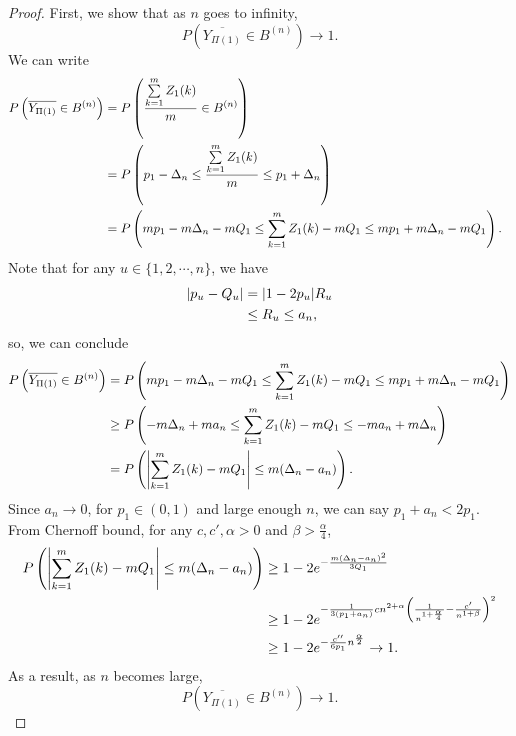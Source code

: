 \begin{proof}
First, we show that as $n$ goes to infinity,
\[P\left( \overline{Y_{\Pi(1) }}\in B^{(n)}\right) \rightarrow 1.\]
We can write
\begin{align}
\no P\left(\overline{Y_{\Pi(1)}} \in B^{(n)}\right) &= P\left(\frac{\sum\limits_{k=1}^{m}Z_1(k)}{m} \in  B^{(n)} \right)\\
\nonumber &= P\left(p_1-\Delta_n \leq\frac{\sum\limits_{k=1}^{m}Z_1(k)}{m}\leq p_1+\Delta_n \right)\\
\nonumber &= P\left(mp_1-m\Delta_n-mQ_1\leq \sum\limits_{k=1}^{m}Z_1(k)-mQ_1\leq  mp_1+m\Delta_n-mQ_1 \right).\ \
\end{align}
Note that for any $u \in \{1,2,\cdots, n \}$, we have
\begin{align}
\no |p_u-{Q}_u| &=|1-2p_u|R_u \\
\no & \leq R_u \leq a_n,
\end{align}
so, we can conclude
\begin{align}
\no P\left(\overline{Y_{\Pi(1)}} \in B^{(n)}\right) &= P\left(mp_1-m\Delta_n-mQ_1\leq \sum\limits_{k=1}^{m}Z_1(k)-mQ_1 \leq mp_1+m\Delta_n-mQ_1 \right)\\
\nonumber  &\geq P\left(-m\Delta_n+m a_n\leq \sum\limits_{k=1}^{m}Z_1(k)-mQ_1\leq -ma_n+m\Delta_n \right)\\
\nonumber &= P\left(\abs*{\sum\limits_{k=1}^{m}Z_1(k)-mQ_1}\leq m (\Delta_n-a_n) \right).\ \
\end{align}
Since $a_n \rightarrow 0$, for $p_1 \in (0,1)$ and large enough $n$, we can say $p_1+a_n < 2 p_1$. From Chernoff bound, for any $c,c',\alpha>0$ and $\beta>\frac{\alpha}{4}$,
\begin{align}
\no P\left(\abs*{\sum\limits_{k=1}^{m}Z_1(k)-mQ_1}\leq m (\Delta_n-a_n) \right) &\geq 1-2e^{-\frac{m(\Delta_n-a_n)^2}{3Q_1}} \\
\nonumber &\geq 1-2e^{-\frac{1}{3(p_1+a_n)}cn^{2+\alpha}\left(\frac{1}{n^{1+\frac{\alpha}{4}}}- \frac{c'}{n^{1 +  \beta}}\right)^2}\\
\nonumber &\geq 1-2e^{-\frac{c''}{6 p_1}n^{\frac{\alpha}{2}}}\rightarrow 1. \ \
\end{align}
As a result, as $n$ becomes large,
\[P\left(\overline{Y_{\Pi(1)}} \in B^{(n)}\right) \rightarrow 1.\]


\end{proof}
